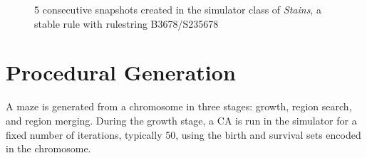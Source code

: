 \begin{figure}[!h]
\centering
            \hfill
            \hfill
            \hfill
            \hfill
            \hfill
            \caption{5 consecutive snapshots created in the simulator class of \textit{Stains}, a stable rule with rulestring B3678/S235678}
\label{fig:stains}
\end{figure}

\section{Procedural Generation}
A maze is generated from a chromosome in three stages: growth, region search, and region merging. During the growth stage, a CA is run in the simulator for a fixed number of iterations, typically 50, using the birth and survival sets encoded in the chromosome. 

